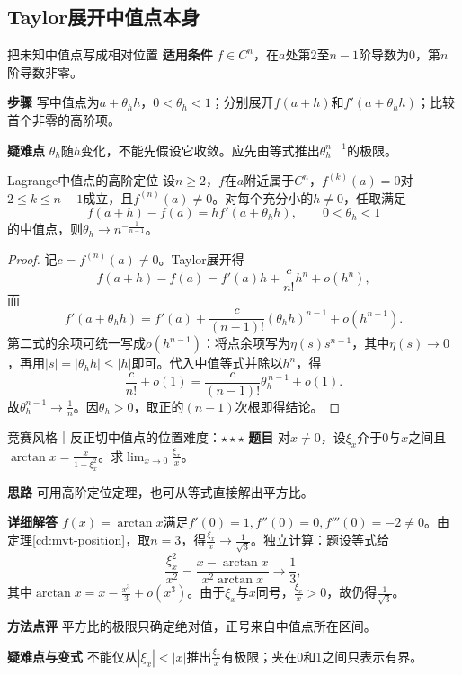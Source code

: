 \subsection{Taylor展开中值点本身}
\begin{method}{把未知中值点写成相对位置}
\textbf{适用条件} $f\in C^n$，在$a$处第2至$n-1$阶导数为0，第$n$阶导数非零。\par
\textbf{步骤} 写中值点为$a+\theta_hh$，$0<\theta_h<1$；分别展开$f(a+h)$和$f'(a+\theta_hh)$；比较首个非零的高阶项。\par
\textbf{疑难点} $\theta_h$随$h$变化，不能先假设它收敛。应先由等式推出$\theta_h^{n-1}$的极限。
\end{method}
\begin{theorem}{Lagrange中值点的高阶定位}\label{cd:mvt-position}
设$n\ge2$，$f$在$a$附近属于$C^n$，$f^{(k)}(a)=0$对$2\le k\le n-1$成立，且$f^{(n)}(a)\ne0$。对每个充分小的$h\ne0$，任取满足
\[
 f(a+h)-f(a)=h f'(a+\theta_hh),\qquad0<\theta_h<1
\]
的中值点，则$\theta_h\to n^{-\frac{1}{n-1}}$。
\end{theorem}
\begin{proof}
记$c=f^{(n)}(a)\ne0$。Taylor展开得
\[
 f(a+h)-f(a)=f'(a)h+\dfrac{c}{n!}h^n+o(h^n),
\]
而
\[
 f'(a+\theta_hh)
 =f'(a)+\dfrac{c}{(n-1)!}(\theta_hh)^{n-1}+o(h^{n-1}).
\]
第二式的余项可统一写成$o(h^{n-1})$：将点余项写为$\eta(s)s^{n-1}$，其中$\eta(s)\to0$，再用$|s|=|\theta_hh|\le|h|$即可。代入中值等式并除以$h^n$，得
\[
 \dfrac{c}{n!}+o(1)
 =\dfrac{c}{(n-1)!}\theta_h^{\,n-1}+o(1).
\]
故$\theta_h^{n-1}\to\frac{1}{n}$。因$\theta_h>0$，取正的$(n-1)$次根即得结论。
\end{proof}
\begin{example}{竞赛风格｜反正切中值点的位置}{难度：$\star\star\star$}\label{cd:ex:mvt-position}
\textbf{题目} 对$x\ne0$，设$\xi_x$介于0与$x$之间且$\arctan x=\frac{x}{1+\xi_x^2}$。求$\lim_{x\to0}\frac{\xi_x}{x}$。\par
\textbf{思路} 可用高阶定位定理，也可从等式直接解出平方比。\par
\textbf{详细解答} $f(x)=\arctan x$满足$f'(0)=1,f''(0)=0,f'''(0)=-2\ne0$。由定理\ref{cd:mvt-position}，取$n=3$，得$\frac{\xi_x}{x}\to\frac{1}{\sqrt3}$。独立计算：题设等式给
\[
 \dfrac{\xi_x^2}{x^2}
 =\dfrac{x-\arctan x}{x^2\arctan x}
 \to\dfrac13,
\]
其中$\arctan x=x-\frac{x^3}{3}+o(x^3)$。由于$\xi_x$与$x$同号，$\frac{\xi_x}{x}>0$，故仍得$\frac{1}{\sqrt3}$。\par
\textbf{方法点评} 平方比的极限只确定绝对值，正号来自中值点所在区间。\par
\textbf{疑难点与变式} 不能仅从$|\xi_x|<|x|$推出$\frac{\xi_x}{x}$有极限；夹在0和1之间只表示有界。
\end{example}

